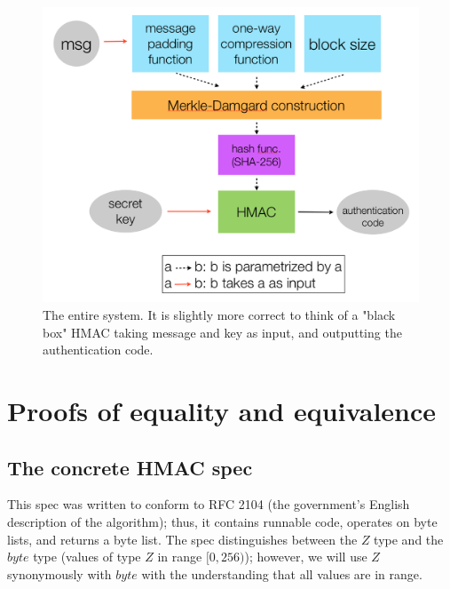 \documentclass[twocolumn,showpacs,%
  nofootinbib,aps,superscriptaddress,%
  eqsecnum,prd,notitlepage,showkeys,10pt]{revtex4-1}
\begin{document}
\begin{figure}[h!]
	\centering
	\includegraphics[scale=0.4]{Cryptosystem}
	\caption{The entire system. It is slightly more correct to think of a "black box" HMAC taking message and key as input, and outputting the authentication code.}
\end{figure}




\section{Proofs of equality and equivalence}

\subsection{The concrete HMAC spec}

This spec was written to conform to RFC 2104 (the government's English description of the algorithm); thus, it contains runnable code, operates on byte lists, and returns a byte list. The spec distinguishes between the $Z$ type and the $byte$ type (values of type $Z$ in range $[0, 256)$); however, we will use $Z$ synonymously with $byte$ with the understanding that all values are in range.
\end{document}
